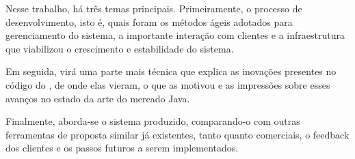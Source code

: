 Nesse trabalho, há três temas principais. Primeiramente, o processo de desenvolvimento, isto é, quais foram os métodos ágeis adotados para gerenciamento do sistema, a importante interação com clientes e a infraestrutura que viabilizou o crescimento e estabilidade do sistema. 

Em seguida, virá uma parte mais técnica que explica as inovações presentes no código do \calopsita{}, de onde elas vieram, o que as motivou e as impressões sobre esses avanços no estado da arte do mercado Java.

Finalmente, aborda-se o sistema produzido, comparando-o com outras ferramentas de proposta similar já existentes, tanto \opensource{} quanto comerciais, o feedback dos clientes e os passos futuros a serem implementados.
